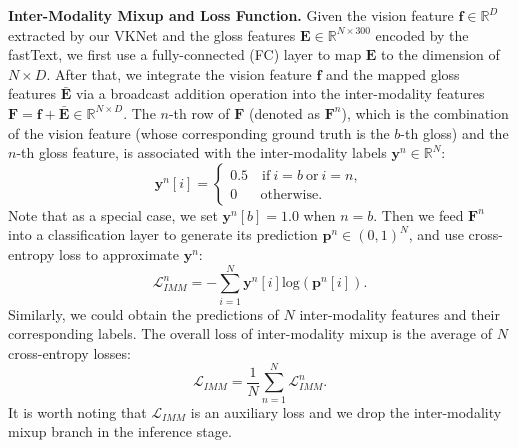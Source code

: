 \documentclass[10pt,twocolumn,letterpaper]{article}
\begin{document}
\noindent\textbf{Inter-Modality Mixup and Loss Function.} Given the vision feature $\boldsymbol{f}\in \mathbb{R}^{D}$ extracted by our VKNet and the gloss features $\boldsymbol{E} \in \mathbb{R}^{N\times 300}$ encoded by the fastText, we first use a fully-connected (FC) layer to map $\boldsymbol{E}$ to the dimension of $N \times D$. After that, we integrate the vision feature $\boldsymbol{f}$ and the mapped gloss features $\bar{\boldsymbol{E}}$ via a broadcast addition operation into the inter-modality features $\boldsymbol{F} = \boldsymbol{f} + \bar{\boldsymbol{E}} \in\mathbb{R}^{N \times D}$. The $n$-th row of $\boldsymbol{F}$ (denoted as $\boldsymbol{F}^n$), which is the combination of the vision feature (whose corresponding ground truth is the $b$-th gloss) and the $n$-th gloss feature, is associated with the inter-modality labels $\boldsymbol{y}^n \in \mathbb{R}^{N}$:
\begin{equation}
\boldsymbol{y}^n[i] = 
\begin{cases}
    0.5 \quad \text{if}\  i=b~\text{or}~i=n, \\
    0 ~~~\quad \text{otherwise}.
\end{cases}
\end{equation}
Note that as a special case, we set $\boldsymbol{y}^n[b]=1.0$ when $n=b$. Then we feed $\boldsymbol{F}^n$ into a classification layer to generate its prediction $\boldsymbol{p}^n \in (0,1)^{N}$, and use cross-entropy loss to approximate $\boldsymbol{y}^n$:
\begin{equation}
    \mathcal{L}_{IMM}^{n} = -\sum_{i=1}^{N}\boldsymbol{y}^n[i]\text{log}(\boldsymbol{p}^n[i]).
\end{equation}
Similarly, we could obtain the predictions of $N$ inter-modality features and their corresponding labels. The overall loss of inter-modality mixup is the average of $N$ cross-entropy losses:
\begin{equation}
    \mathcal{L}_{IMM} = \frac{1}{N}\sum_{n=1}^{N}\mathcal{L}_{IMM}^{n}.
\end{equation}
It is worth noting that $\mathcal{L}_{IMM}$ is an auxiliary loss and we drop the inter-modality mixup branch in the inference stage.
\end{document}
